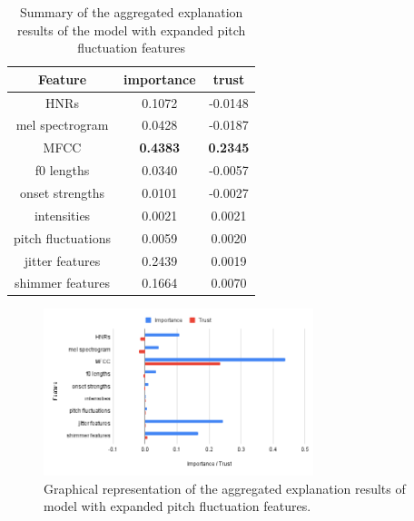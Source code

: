 \documentclass{article}
\begin{document}
		\begin{table}[htbp]
			\caption{Summary of the aggregated explanation results of the model with expanded
			pitch fluctuation features}
			\vspace{10pt}
			\centering
			\begin{tabular}{c | c | c}
				\hline
				Feature & importance & trust \\
				\hline
				HNRs & 0.1072 & -0.0148 \\
				mel spectrogram & 0.0428 & -0.0187 \\
				MFCC & \textbf{0.4383} & \textbf{0.2345} \\
				f0 lengths & 0.0340 & -0.0057 \\
				onset strengths & 0.0101 & -0.0027 \\
				intensities & 0.0021 & 0.0021 \\
				pitch fluctuations & 0.0059 & 0.0020 \\
				jitter features & 0.2439 & 0.0019 \\
				shimmer features & 0.1664 & 0.0070
			\end{tabular}
			\label{table:exp-results-more-pitch-flucs}
		\end{table}
		\begin{figure}
			\centering
			\includegraphics[width=0.7\textwidth]{images/exp_mpf.png}
			\caption{Graphical representation of the aggregated explanation results of model with
			expanded pitch fluctuation features.}
			\label{fig:exp_mpf}
		\end{figure}
\end{document}
